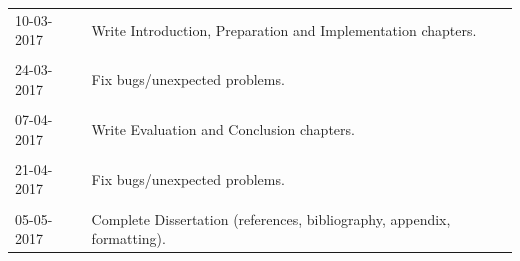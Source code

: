 \documentclass[12pt,a4paper]{article}
\begin{document}
\begin{table}[h]
\begin{tabular}{ll}
	10-03-2017	&	Write Introduction, Preparation and Implementation chapters. \\ \\

    24-03-2017	&	Fix bugs/unexpected problems. \\ \\
    
    07-04-2017	&	Write Evaluation and Conclusion chapters. \\ \\

    21-04-2017	&	Fix bugs/unexpected problems. \\ \\
    
	05-05-2017	&	Complete Dissertation (references, bibliography, appendix, formatting). \\

  \bottomrule

\end{tabular}
\end{table}
\vspace*{\fill}

\ifwhole \else

  \newpage
  
  
  \cleardoublepage{}

\fi
\end{document}
